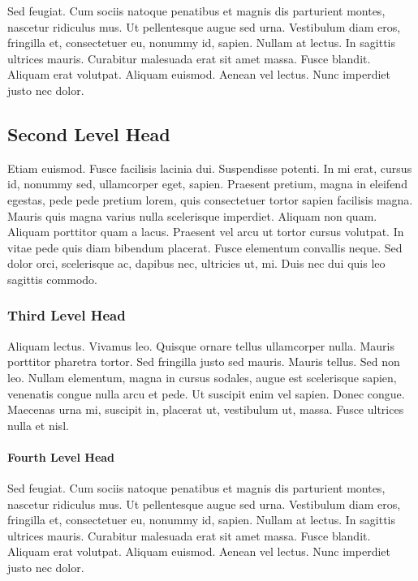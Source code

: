 \documentclass[ASNA,twocolumn]{USG} %
\begin{document}
{Sed feugiat. Cum sociis natoque penatibus et magnis dis parturient montes, nascetur ridiculus mus. Ut pellentesque
augue sed urna. Vestibulum diam eros, fringilla et, consectetuer eu, nonummy id, sapien. Nullam at lectus. In sagittis
ultrices mauris. Curabitur malesuada erat sit amet massa. Fusce blandit. Aliquam erat volutpat. Aliquam euismod.
Aenean vel lectus. Nunc imperdiet justo nec dolor.

\subsection{Second Level Head}

Etiam euismod. Fusce facilisis lacinia dui. Suspendisse potenti. In mi erat, cursus id, nonummy sed, ullamcorper
eget, sapien. Praesent pretium, magna in eleifend egestas, pede pede pretium lorem, quis consectetuer tortor sapien
facilisis magna. Mauris quis magna varius nulla scelerisque imperdiet. Aliquam non quam. Aliquam porttitor quam
a lacus. Praesent vel arcu ut tortor cursus volutpat. In vitae pede quis diam bibendum placerat. Fusce elementum
convallis neque. Sed dolor orci, scelerisque ac, dapibus nec, ultricies ut, mi. Duis nec dui quis leo sagittis commodo.


\subsubsection{Third Level Head}

Aliquam lectus. Vivamus leo. Quisque ornare tellus ullamcorper nulla. Mauris porttitor pharetra tortor. Sed fringilla
justo sed mauris. Mauris tellus. Sed non leo. Nullam elementum, magna in cursus sodales, augue est scelerisque
sapien, venenatis congue nulla arcu et pede. Ut suscipit enim vel sapien. Donec congue. Maecenas urna mi, suscipit
in, placerat ut, vestibulum ut, massa. Fusce ultrices nulla et nisl.

\paragraph{Fourth Level Head}

Sed feugiat. Cum sociis natoque penatibus et magnis dis parturient montes, nascetur ridiculus mus. Ut pellentesque
augue sed urna. Vestibulum diam eros, fringilla et, consectetuer eu, nonummy id, sapien. Nullam at lectus. In sagittis
ultrices mauris. Curabitur malesuada erat sit amet massa. Fusce blandit. Aliquam erat volutpat. Aliquam euismod.
Aenean vel lectus. Nunc imperdiet justo nec dolor.

}
\end{document}
